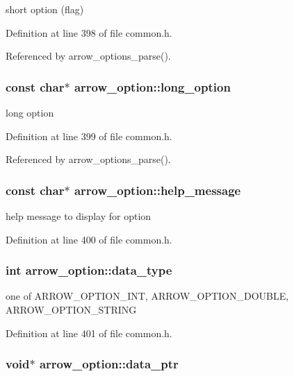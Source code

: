short option (flag) 

Definition at line 398 of file common.h.

Referenced by arrow\_\-options\_\-parse().\hypertarget{structarrow__option_3d8ddc7b0d627a15c7108e21a16cb51a}{
\subsubsection{\setlength{\rightskip}{0pt plus 5cm}const char$\ast$ {\bf arrow\_\-option::long\_\-option}}}
\label{structarrow__option_3d8ddc7b0d627a15c7108e21a16cb51a}


long option 

Definition at line 399 of file common.h.

Referenced by arrow\_\-options\_\-parse().\hypertarget{structarrow__option_48bfe5bda71cd04d92067b203ffb92ce}{
\subsubsection{\setlength{\rightskip}{0pt plus 5cm}const char$\ast$ {\bf arrow\_\-option::help\_\-message}}}
\label{structarrow__option_48bfe5bda71cd04d92067b203ffb92ce}


help message to display for option 

Definition at line 400 of file common.h.\hypertarget{structarrow__option_c97df040be0b7c76e92556087be21ff8}{
\subsubsection{\setlength{\rightskip}{0pt plus 5cm}int {\bf arrow\_\-option::data\_\-type}}}
\label{structarrow__option_c97df040be0b7c76e92556087be21ff8}


one of ARROW\_\-OPTION\_\-INT, ARROW\_\-OPTION\_\-DOUBLE, ARROW\_\-OPTION\_\-STRING 

Definition at line 401 of file common.h.\hypertarget{structarrow__option_0b4e8cc50fdb7d8fbb1e63db30cd172d}{
\subsubsection{\setlength{\rightskip}{0pt plus 5cm}void$\ast$ {\bf arrow\_\-option::data\_\-ptr}}}
\label{structarrow__option_0b4e8cc50fdb7d8fbb1e63db30cd172d}


